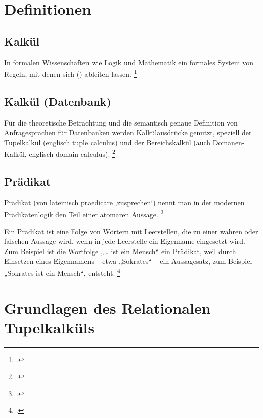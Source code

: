 \documentclass{lehramt-informatik-haupt}
\begin{document}
\section{Definitionen}

%

\subsection{Kalkül}

In formalen Wissenschaften wie Logik und Mathematik ein formales System
von Regeln, mit denen sich 
()  ableiten lassen.
\footcite{wiki:kalkuel}

%

\subsection{Kalkül (Datenbank)}

Für die theoretische Betrachtung und die semantisch genaue Definition
von Anfragesprachen für Datenbanken werden Kalkülausdrücke genutzt,
speziell der Tupelkalkül (englisch tuple calculus) und der
Bereichskalkül (auch Domänen-Kalkül, englisch domain calculus).
\footcite{wiki:kalkuel-datenbank}

%

\subsection{Prädikat}

Prädikat (von lateinisch praedicare ‚zusprechen‘) nennt man in der
modernen Prädikatenlogik den Teil einer atomaren Aussage.
\footcite{wiki:praedikat-logik}

Ein Prädikat ist eine Folge von Wörtern mit Leerstellen, die zu einer
wahren oder falschen Aussage wird, wenn in jede Leerstelle ein Eigenname
eingesetzt wird. Zum Beispiel ist die Wortfolge „… ist ein Mensch“ ein
Prädikat, weil durch Einsetzen eines Eigennamens – etwa „Sokrates“ – ein
Aussagesatz, zum Beispiel „Sokrates ist ein Mensch“, entsteht.
\footcite{wiki:praedikatenlogik}

%

\section{Grundlagen des Relationalen Tupelkalküls}
\end{document}
